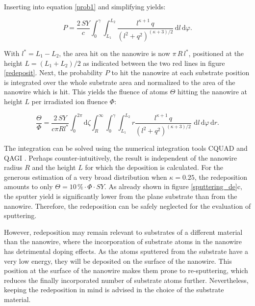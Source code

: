 Inserting into equation \ref{prob1} and simplifying yields:

\begin{equation}
\label{prob2}
P = \frac{2\,SY}{c} \int_0^{\gamma} \! \int_{L_1}^{L_2} \!  \frac{l^{\kappa+1}\,q}{(l^2 + q^2)^{(\kappa + 3)/2}} \,\mathrm{d}l \, \mathrm{d}\varphi.
\end{equation}

With $l^*=L_1-L_2$, the area hit on the nanowire is now $\pi \, R \, l^*$, positioned at the height $L= (L_1+L_2)/2$ as indicated between the two red lines in figure \ref{redeposit}. Next, the probability $P$ to hit the nanowire at each substrate position is integrated over the whole substrate area and normalized to the area of the nanowire which is hit. This yields the fluence of atoms $\Theta$ hitting the nanowire at height $L$ per irradiated ion fluence $\Phi$:

\begin{equation}
\label{prob3}
\frac{\Theta}{\Phi} = \frac{2\,SY}{c \pi Rl^*} \int_0^{2\pi}\! \mathrm{d}\zeta \int_R^{\infty} \!
\int_0^{\gamma} \! \int_{L_1}^{L_2} \! r \frac{l^{\kappa+1}\,q}{(l^2 + q^2)^{(\kappa + 3)/2}}\,\,\mathrm{d}l \, \mathrm{d}\varphi\,\mathrm{d}r.
\end{equation}

The integration can be solved using the numerical integration tools CQUAD and QAGI \cite{gough_gnu_2009}. Perhaps counter-intuitively, the result is independent of the nanowire radius $R$ and the height $L$ for which the deposition is calculated. For the generous estimation of a very broad distribution when $\kappa = 0.25$, the redeposition amounts to only $\Theta =10\,\% \cdot \Phi\cdot SY$. As already shown in figure \ref{sputtering_de}c, the sputter yield is significantly lower from the plane substrate than from the nanowire. Therefore, the redeposition can be safely neglected for the evaluation of sputtering. 

However, redeposition may remain relevant to substrates of a different material than the nanowire, where the incorporation of substrate atoms in the nanowire has detrimental doping effects. As the atoms sputtered from the substrate have a very low energy, they will be deposited on the surface of the nanowire. This position at the surface of the nanowire makes them prone to re-sputtering, which reduces the finally incorporated number of substrate atoms further. Nevertheless, keeping the redeposition in mind is advised in the choice of the substrate material.


